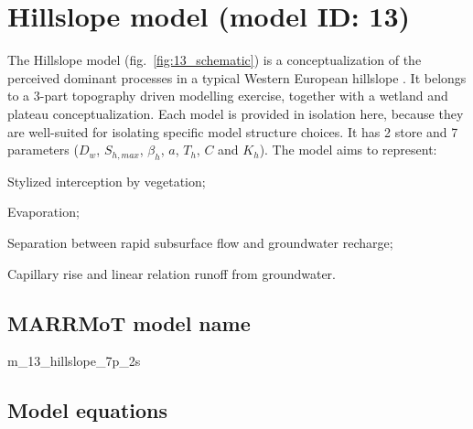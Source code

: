 \section{Hillslope model (model ID: 13)}
The Hillslope model (fig.~\ref{fig:13_schematic}) is a conceptualization of the perceived dominant processes in a typical Western European hillslope \citep{Savenije2010}. It belongs to a 3-part topography driven modelling exercise, together with a wetland and plateau conceptualization. Each model is provided in isolation here, because they are well-suited for isolating specific model structure choices. It has 2 store and 7 parameters ($D_w$, $S_{h,max}$, $\beta_h$, $a$, $T_h$, $C$ and $K_h$). The model aims to represent:

\begin{itemizecompact}
\item Stylized interception by vegetation;
\item Evaporation;
\item Separation between rapid subsurface flow and groundwater recharge;
\item Capillary rise and linear relation runoff from groundwater.
\end{itemizecompact}

\subsection{MARRMoT model name}
m\_13\_hillslope\_7p\_2s \\

\subsection{Model equations}

